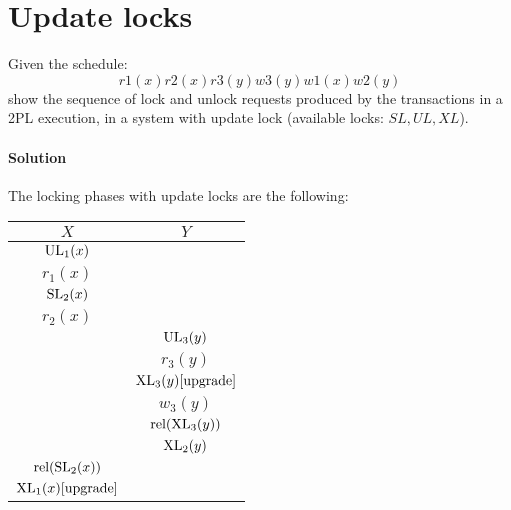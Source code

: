 \section{Update locks}

Given the schedule:
\[r1(x) r2(x) r3(y) w3(y) w1(x) w2(y)\]
show the sequence of lock and unlock requests produced by the transactions in a 2PL execution, in a system with update lock (available locks: $SL, UL, XL$).

\paragraph*{Solution}
The locking phases with update locks are the following: 
\begin{table}[H]
    \centering
    \begin{tabular}{|c|c|}
    \hline
    $X$                                           & $Y$                                           \\ \hline
    $\textnormal{UL}_1(x)$                        &                                               \\
    $r_1(x)$                                      &                                               \\
    $\textnormal{SL}_2(x)$                        &                                               \\
    $r_2(x)$                                      &                                               \\
                                                    & $\textnormal{UL}_3(y)$                        \\
                                                    & $r_3(y)$                                      \\
                                                    & $\textnormal{XL}_3(y) [\textnormal{upgrade}]$ \\
                                                    & $w_3(y)$                                      \\
                                                    & $\textnormal{rel}(\textnormal{XL}_3(y))$      \\
                                                    & $\textnormal{XL}_2(y)$                        \\
    $\textnormal{rel}(\textnormal{SL}_2(x))$      &                                               \\
    $\textnormal{XL}_1(x) [\textnormal{upgrade}]$ &                                               \\

\end{tabular}
\end{table}

